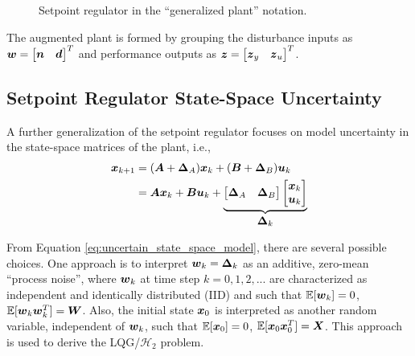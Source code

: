 \begin{figure}[H]
{
}
\caption{Setpoint regulator in the ``generalized plant'' notation.}
\label{fig:regulator_generalized}
\end{figure}

The augmented plant is formed by grouping the disturbance inputs as $\vb*{w} = \begin{bmatrix} \vb*{n} & \vb*{d} \end{bmatrix}^{T}$ and performance outputs as $\vb*{z} = \begin{bmatrix} \vb*{z}_{y} & \vb*{z}_{u} \end{bmatrix}^{T}$.

\subsection{Setpoint Regulator State-Space Uncertainty}
A further generalization of the setpoint regulator focuses on model uncertainty in the state-space matrices of the plant, i.e.,
\begin{equation}
\label{eq:uncertain_state_space_model}
\begin{aligned}
	\vb*{x}_{k+1} &= (\vb*{A} + \vb*{\Delta}_{A})\vb*{x}_{k} + (\vb*{B} + \vb*{\Delta}_{B})\vb*{u}_{k}\\
		&= \vb*{A}\vb*{x}_{k} + \vb*{B}\vb*{u}_{k} + 
		\underbrace{\begin{bmatrix} \vb*{\Delta}_{A} & \vb*{\Delta}_{B} \end{bmatrix}
			\begin{bmatrix} \vb*{x}_{k} \\ \vb*{u}_{k} \end{bmatrix}}_{\text{\normalsize $\vb*{\Delta}_{k}$}}
\end{aligned}
\end{equation}

From Equation \eqref{eq:uncertain_state_space_model}, there are several possible choices.  One approach is to interpret $\vb*{w}_{k} = \vb*{\Delta}_{k}$ as an additive, zero-mean ``process noise'', where $\vb*{w}_{k}$ at time step $k = 0,1,2,...$ are characterized as independent and identically distributed (IID) and such that $\mathbb{E}[\vb*{w}_{k}] = 0$, $\mathbb{E}[\vb*{w}_{k}\vb*{w}_{k}^{T}] = \vb*{W}$.  Also, the initial state $\vb*{x}_{0}$ is interpreted as another random variable, independent of $\vb*{w}_{k}$, such that $\mathbb{E}[\vb*{x}_{0}] = 0$, $\mathbb{E}[\vb*{x}_{0}\vb*{x}_{0}^{T}] = \vb*{X}$.  This approach is used to derive the LQG/$\mathcal{H}_{2}$ problem.

